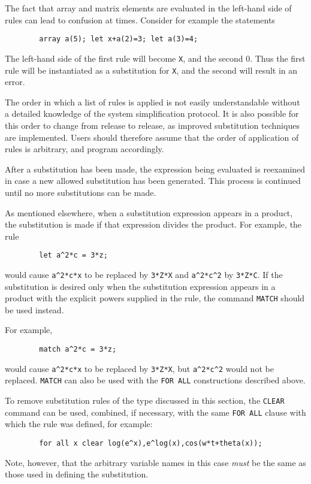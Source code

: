 \documentclass[11pt,letterpaper]{book}
\makeatletter
\newcommand{\underscore}{\_}
\newcommand{\ttindex}[1]{{\renewcommand{\_}{\protect\underscore}%
                          \index{#1@{\tt #1}}}}
\makeatother
\begin{document}
The fact that array and matrix elements are evaluated in the left-hand side
of rules can lead to confusion at times. Consider for example the
statements
{\small\begin{verbatim}
        array a(5); let x+a(2)=3; let a(3)=4;
\end{verbatim}}
The left-hand side of the first rule will become {\tt X}, and the second
0.  Thus the first rule will be instantiated as a substitution for
{\tt X}, and the second will result in an error.

The order in which a list of rules is applied is not easily understandable
without a detailed knowledge of the system simplification protocol. It is
also possible for this order to change from release to release, as improved
substitution techniques are implemented. Users should therefore assume
that the order of application of rules is arbitrary, and program
accordingly.

After a substitution has been made, the expression being evaluated is
reexamined in case a new allowed substitution has been generated. This
process is continued until no more substitutions can be made.

As mentioned elsewhere, when a substitution expression appears in a
product, the substitution is made if that expression divides the product.
For example, the rule
{\small\begin{verbatim}
        let a^2*c = 3*z;
\end{verbatim}}
would cause {\tt a\verb|^|2*c*x} to be replaced by {\tt 3*Z*X} and
{\tt a\verb|^|2*c\verb|^|2} by {\tt 3*Z*C}.  If the substitution is desired only
when the substitution expression appears in a product with the explicit
powers supplied in the rule, the command {\tt MATCH} should be used
instead.\ttindex{MATCH}

For example,
{\small\begin{verbatim}
        match a^2*c = 3*z;
\end{verbatim}}
would cause {\tt a\verb|^|2*c*x} to be replaced by {\tt 3*Z*X}, but
{\tt a\verb|^|2*c\verb|^|2} would not be replaced. {\tt MATCH} can also be used
with the {\tt FOR ALL} constructions described above.

To remove substitution rules of the type discussed in this section, the
{\tt CLEAR}\ttindex{CLEAR} command can be used, combined, if necessary,
with the same {\tt FOR ALL} clause with which the rule was defined, for
example:
{\small\begin{verbatim}
        for all x clear log(e^x),e^log(x),cos(w*t+theta(x));
\end{verbatim}}
Note, however, that the arbitrary variable names in this case {\em must\/}
be the same as those used in defining the substitution.
\end{document}
